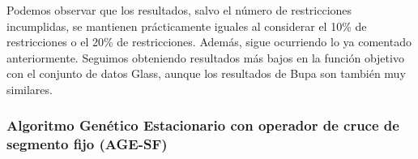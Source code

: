 Podemos observar que los resultados, salvo el número de restricciones incumplidas, se mantienen prácticamente iguales al considerar el 10\% de restricciones o el 20\% de restricciones.
Además, sigue ocurriendo lo ya comentado anteriormente. Seguimos obteniendo resultados más bajos en la función objetivo con el conjunto de datos Glass, aunque los resultados de Bupa son también muy similares.

\subsubsection{Algoritmo Genético Estacionario con operador de cruce de segmento fijo (AGE-SF)}


\begin{table}[H]
	\tiny

	\begin{adjustwidth}{-1cm}{-1cm}%
	

\end{adjustwidth}
\end{table}
